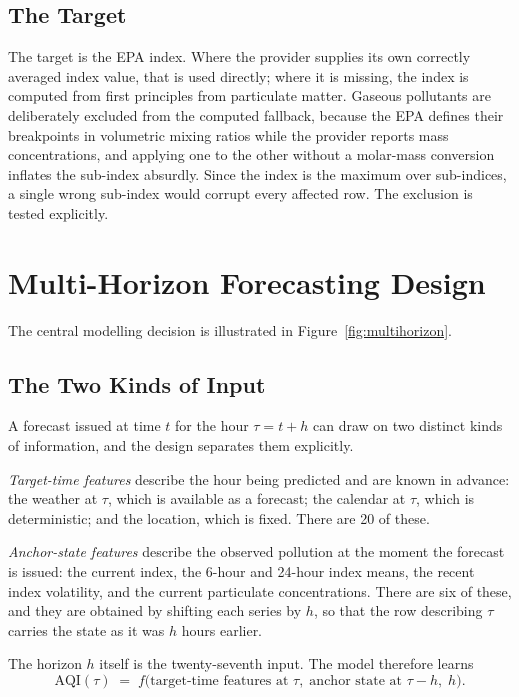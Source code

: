 \subsection{The Target}
The target is the EPA index. Where the provider supplies its own correctly
averaged index value, that is used directly; where it is missing, the index is
computed from first principles from particulate matter. Gaseous pollutants are
deliberately excluded from the computed fallback, because the EPA defines their
breakpoints in volumetric mixing ratios while the provider reports mass
concentrations, and applying one to the other without a molar-mass conversion
inflates the sub-index absurdly. Since the index is the maximum over sub-indices,
a single wrong sub-index would corrupt every affected row. The exclusion is
tested explicitly.

\section{Multi-Horizon Forecasting Design}
\label{sec:design-mh}
The central modelling decision is illustrated in Figure~\ref{fig:multihorizon}.


\subsection{The Two Kinds of Input}
A forecast issued at time $t$ for the hour $\tau = t + h$ can draw on two
distinct kinds of information, and the design separates them explicitly.

\emph{Target-time features} describe the hour being predicted and are known in
advance: the weather at $\tau$, which is available as a forecast; the calendar at
$\tau$, which is deterministic; and the location, which is fixed. There are 20 of
these.

\emph{Anchor-state features} describe the observed pollution at the moment the
forecast is issued: the current index, the 6-hour and 24-hour index means, the
recent index volatility, and the current particulate concentrations. There are
six of these, and they are obtained by shifting each series by $h$, so that the
row describing $\tau$ carries the state as it was $h$ hours earlier.

The horizon $h$ itself is the twenty-seventh input. The model therefore learns
\[
\mathrm{AQI}(\tau) \;=\; f\big(\text{target-time features at } \tau,\;
\text{anchor state at } \tau - h,\; h\big).
\]


